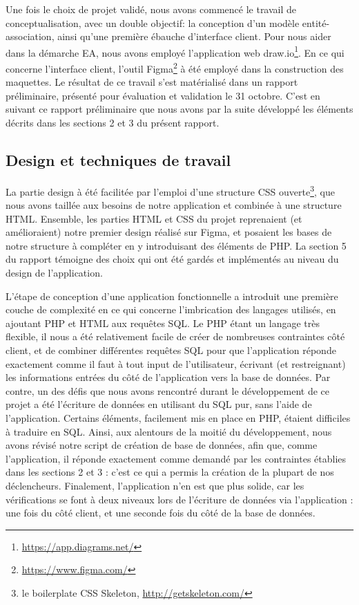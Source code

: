 \documentclass[a4paper,12pt]{article}
\begin{document}
Une fois le choix de projet validé, nous avons commencé le travail de conceptualisation, avec un double objectif: la conception d'un modèle entité-association, ainsi qu'une première ébauche d'interface client.
Pour nous aider dans la démarche EA, nous avons employé l'application web draw.io\footnote{\url{https://app.diagrams.net/}}.
En ce qui concerne l'interface client, l'outil Figma\footnote{\url{https://www.figma.com/}} à été employé dans la construction des maquettes.
Le résultat de ce travail s'est matérialisé dans un rapport préliminaire, présenté pour évaluation et validation le 31 octobre.
C'est en suivant ce rapport préliminaire que nous avons par la suite développé les éléments décrits dans les sections 2 et 3 du présent rapport.
 
\subsection{Design et techniques de travail }

La partie design à été facilitée par l'emploi d'une structure CSS ouverte\footnote{le boilerplate CSS Skeleton, \url{http://getskeleton.com/}}, que nous avons taillée aux besoins de notre application et combinée à une structure HTML.
Ensemble, les parties HTML et CSS du projet reprenaient (et amélioraient) notre premier design réalisé sur Figma, et posaient les bases de notre structure à compléter en y introduisant des éléments de PHP.
La section 5 du rapport témoigne des choix qui ont été gardés et implémentés au niveau du design de l'application.

L'étape de conception d'une application fonctionnelle a introduit une première couche de complexité en ce qui concerne l'imbrication des langages utilisés, en ajoutant PHP et HTML aux requêtes SQL.
Le PHP étant un langage très flexible, il nous a été relativement facile de créer de nombreuses contraintes côté client, et de combiner différentes requêtes SQL pour que l'application réponde exactement comme il faut à tout input de l'utilisateur, écrivant (et restreignant) les informations entrées du côté de l'application vers la base de données. 
Par contre, un des défis que nous avons rencontré durant le développement de ce projet a été l'écriture de données en utilisant du SQL pur, sans l'aide de l'application.
Certains éléments, facilement mis en place en PHP, étaient difficiles à traduire en SQL.
Ainsi, aux alentours de la moitié du développement, nous avons révisé notre script de création de base de données, afin que, comme l'application, il réponde exactement comme demandé par les contraintes établies dans les sections 2 et 3 : c'est ce qui a permis la création de la plupart de nos déclencheurs.
Finalement, l'application n'en est que plus solide, car les vérifications se font à deux niveaux lors de l'écriture de données via l'application : une fois du côté client, et une seconde fois du côté de la base de données.
\end{document}
